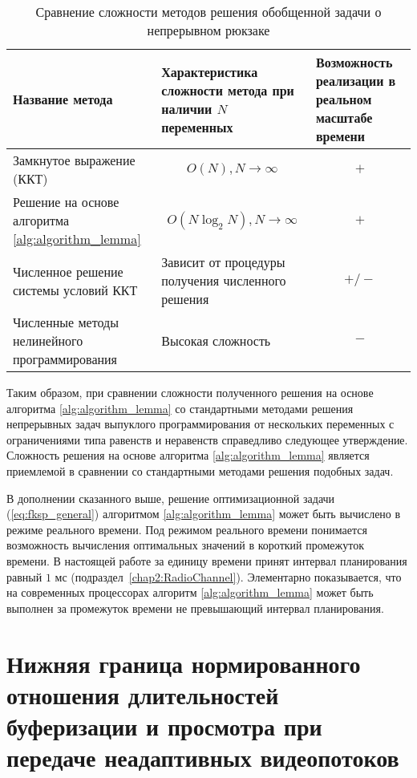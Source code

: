 \begin{table}[!h]
    \caption{Сравнение сложности методов решения обобщенной задачи о непрерывном рюкзаке}
    \begin{center}
		\label{tab:nonadaptiveComplexity}
	    \begin{tabular}{| C{5cm} | C{5cm} | C{5cm} |}
	    	\hline
	    	Название метода & Характеристика сложности метода при наличии $N$ переменных & Возможность реализации в реальном масштабе времени\\
	    	\hline
			Замкнутое выражение (ККТ) & $$O(N), N\to\infty$$ & $$+$$\\
	    	\hline
			Решение на основе алгоритма \ref{alg:algorithm_lemma} & $$O(N \log_2 N), N\to\infty$$ & $$+$$\\
	    	\hline
	    	Численное решение системы условий ККТ & Зависит от процедуры получения численного решения & $$+/-$$ \\
	    	\hline
	    	Численные методы нелинейного программирования & Высокая сложность & $$-$$ \\
	    	\hline
    	\end{tabular}
	\end{center}
\end{table}

Таким образом, при сравнении сложности полученного решения на основе алгоритма \ref{alg:algorithm_lemma} со стандартными методами решения непрерывных задач выпуклого программирования от нескольких переменных с ограничениями типа равенств и неравенств справедливо следующее утверждение. Сложность решения на основе алгоритма \ref{alg:algorithm_lemma} является приемлемой в сравнении со стандартными методами решения подобных задач.

В дополнении сказанного выше, решение оптимизационной задачи (\ref{eq:fksp_general}) алгоритмом \ref{alg:algorithm_lemma} может быть вычислено в режиме реального времени. Под режимом реального времени понимается возможность вычисления оптимальных значений в короткий промежуток времени. В настоящей работе за единицу времени принят интервал планирования равный $1$ мс (подраздел~\ref{chap2:RadioChannel}). Элементарно показывается, что на современных процессорах алгоритм \ref{alg:algorithm_lemma} может быть выполнен за промежуток времени не превышающий интервал планирования.

\section{Нижняя граница нормированного отношения длительностей буферизации и просмотра при передаче неадаптивных видеопотоков}
\label{chap3:LowerBoundForG}

